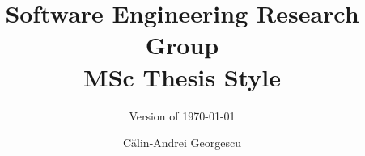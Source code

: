 \documentclass[twoside,a4paper,11pt,openany]{memoir}
\title{Software Engineering Research Group \\MSc Thesis Style}
\subtitle{Version of \today}
\author{C\u alin-Andrei Georgescu}                               %
\begin{document}
\frontmatter
\thispagestyle{empty}
\maketitle                                      %
\makeformaltitlepages{}         %



\cleardoublepage\tableofcontents
\cleardoublepage\listoffigures
\cleardoublepage\mainmatter
 
 
 





 




\appendix
\def\chaptername{Appendix}





\end{document}
